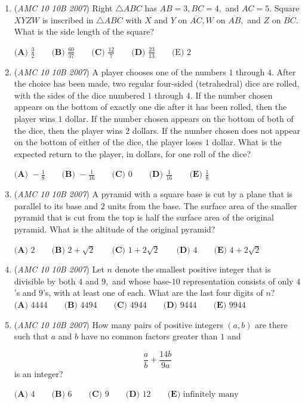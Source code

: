\begin{enumerate}
 $\textbf{(A) } 100 \qquad\textbf{(B) } 125 \qquad\textbf{(C) } 600 \qquad\textbf{(D) } 2300 \qquad\textbf{(E) } 3600$


	\item (\textit{AMC 10 10B 2007}) Right $\triangle ABC$ has $AB=3, BC=4,$ and $AC=5.$ Square $XYZW$ is inscribed in $\triangle ABC$ with $X$ and $Y$ on $\overline{AC}, W$ on $\overline{AB},$ and $Z$ on $\overline{BC}.$ What is the side length of the square?


 $\textbf{(A) } \frac{3}{2} \qquad\textbf{(B) } \frac{60}{37} \qquad\textbf{(C) } \frac{12}{7} \qquad\textbf{(D) } \frac{23}{13} \qquad\text{(E) 2}$


	\item (\textit{AMC 10 10B 2007}) A player chooses one of the numbers $1$ through $4$. After the choice has been made, two regular four-sided (tetrahedral) dice are rolled, with the sides of the dice numbered $1$ through $4.$ If the number chosen appears on the bottom of exactly one die after it has been rolled, then the player wins $1$ dollar. If the number chosen appears on the bottom of both of the dice, then the player wins $2$ dollars. If the number chosen does not appear on the bottom of either of the dice, the player loses $1$ dollar. What is the expected return to the player, in dollars, for one roll of the dice?


 $\textbf{(A) } -\frac{1}{8} \qquad\textbf{(B) } -\frac{1}{16} \qquad\textbf{(C) } 0 \qquad\textbf{(D) } \frac{1}{16} \qquad\textbf{(E) } \frac{1}{8}$


	\item (\textit{AMC 10 10B 2007}) A pyramid with a square base is cut by a plane that is parallel to its base and $2$ units from the base. The surface area of the smaller pyramid that is cut from the top is half the surface area of the original pyramid. What is the altitude of the original pyramid?


 $\textbf{(A) } 2 \qquad\textbf{(B) } 2+\sqrt{2} \qquad\textbf{(C) } 1+2\sqrt{2} \qquad\textbf{(D) } 4 \qquad\textbf{(E) } 4+2\sqrt{2}$


	\item (\textit{AMC 10 10B 2007}) Let $n$ denote the smallest positive integer that is divisible by both $4$ and $9,$ and whose base-$10$ representation consists of only $4$'s and $9$'s, with at least one of each. What are the last four digits of $n?$
$\textbf{(A) } 4444 \qquad\textbf{(B) } 4494 \qquad\textbf{(C) } 4944 \qquad\textbf{(D) } 9444 \qquad\textbf{(E) } 9944$


	\item (\textit{AMC 10 10B 2007}) How many pairs of positive integers $(a,b)$ are there such that $a$ and $b$ have no common factors greater than $1$ and

 \[\frac{a}{b} + \frac{14b}{9a}\]
is an integer?


 $\textbf{(A) } 4 \qquad\textbf{(B) } 6 \qquad\textbf{(C) } 9 \qquad\textbf{(D) } 12 \qquad\textbf{(E) } \text{infinitely many}$


\end{enumerate}
